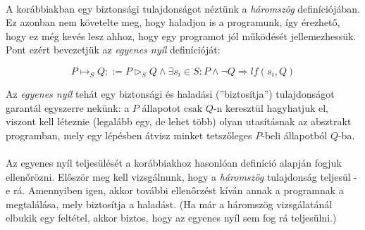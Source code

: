 \documentclass[12pt]{article}
\begin{document}
	\paragraph{}
	A korábbiakban egy biztonsági tulajdonságot néztünk a \textit{háromszög} definíciójában. Ez azonban nem követelte meg, hogy haladjon is a programunk, így érezhető, hogy ez még kevés lesz ahhoz, hogy egy programot jól működését jellemezhessük. Pont ezért bevezetjük az \textit{egyenes nyíl} definícióját:
	
	$$P \mapsto_S Q ::= P \vartriangleright_S Q \land \exists s_i \in S: P \land \neg Q \Rightarrow lf(s_i, Q) $$
	
	Az \textit{egyenes nyíl} tehát egy biztonsági és haladási (''biztosítja'') tulajdonságot garantál egyszerre nekünk: a $P$ állapotot csak $Q$-n keresztül hagyhatjuk el, viszont kell léteznie (legalább egy, de lehet több) olyan utasításnak az absztrakt programban, mely egy lépésben átvisz minket tetszőleges $P$-beli állapotból $Q$-ba.
	\paragraph{}
	Az egyenes nyíl teljesülését a korábbiakhoz hasonlóan definíció alapján fogjuk ellenőrözni. Először meg kell vizsgálnunk, hogy a \textit{háromszög} tulajdonság teljesül -e rá. Amennyiben igen, akkor további ellenőrzést kíván annak a programnak a megtalálása, mely biztosítja a haladást. (Ha már a háromszög vizsgálatánál elbukik egy feltétel, akkor biztos, hogy az egyenes nyíl sem fog rá teljesülni.)
	
\end{document}
